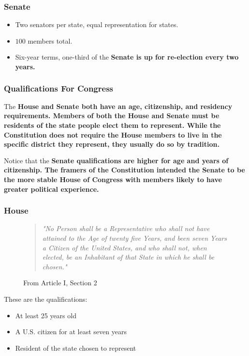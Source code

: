 \subsubsection*{Senate}

\begin{itemize}
    \item Two senators per state, equal representation for states.
    \item $100$ members total.
    \item Six-year terms, one-third of the \bf{Senate} is up for re-election every two years.
\end{itemize}

\subsubsection*{Qualifications For Congress}

The \bf{House} and \bf{Senate} both have an age, citizenship, and residency requirements. Members of both the \bf{House} and \bf{Senate} must be residents of the state people elect them to represent. While the Constitution does not require the \bf{House} members to live in the specific district they represent, they usually do so by tradition.

Notice that the \bf{Senate} qualifications are higher for age and years of citizenship. The framers of the Constitution intended the \bf{Senate} to be the more stable \bf{House} of Congress with members likely to have greater political experience.

\subsubsection*{House}

\begin{figure}[h]
    \begin{quote}
        \it{"No Person shall be a Representative who shall not have attained to the Age of twenty five Years, and been seven Years a Citizen of the United States, and who shall not, when elected, be an Inhabitant of that State in which he shall be chosen."}
    \end{quote}
    \caption{From Article I, Section 2}
\end{figure}

These are the qualifications:

\begin{itemize}
    \item At least 25 years old
    \item A U.S. citizen for at least seven years
    \item Resident of the state chosen to represent
\end{itemize}

